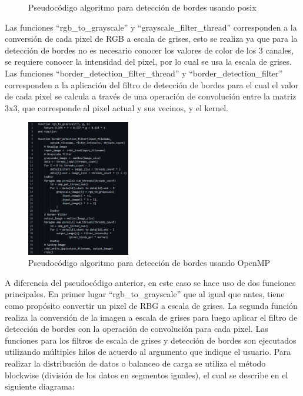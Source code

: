 \begin{itemize}
\begin{figure}[H]
        \caption{Pseudocódigo algoritmo para detección de bordes usando posix}
    \end{figure}
    Las funciones ``rgb\_to\_grayscale'' y ``grayscale\_filter\_thread'' corresponden a la conversión de cada pixel de RGB a escala de grises, esto se realiza ya que para la detección de bordes no es necesario conocer los valores de color de los 3 canales, se requiere conocer la intensidad del pixel, por lo cual se usa la escala de grises. Las funciones ``border\_detection\_filter\_thread'' y ``border\_detection\_filter'' corresponden a la aplicación del filtro de detección de bordes para el cual el valor de cada pixel se calcula a través de una operación de convolución entre la matriz 3x3, que corresponde al pixel actual y sus vecinos, y el kernel.
    \begin{figure}[H]
        \centering
        \includegraphics[width=0.4\textwidth]{../plots/pseudocode_omp.PNG}
        \caption{Pseudocódigo algoritmo para detección de bordes usando OpenMP}
    \end{figure}
    A diferencia del pseudocódigo anterior, en este caso se hace uso de dos funciones principales. En primer lugar ``rgb\_to\_grayscale'' que al igual que antes, tiene como propósito convertir un pixel de RBG a escala de grises. La segunda función realiza la conversión de la imagen a escala de grises para luego aplicar el filtro de detección de bordes con la operación de convolución para cada pixel.
    \newpage
    Las funciones para los filtros de escala de grises y detección de bordes son ejecutados utilizando múltiples hilos de acuerdo al argumento que indique el usuario. Para realizar la distribución de datos o balanceo de carga se utiliza el método blockwise (división de los datos en segmentos iguales), el cual se describe en el siguiente diagrama:
    \begin{figure}[H]
        \centering

\end{figure}
\end{itemize}
